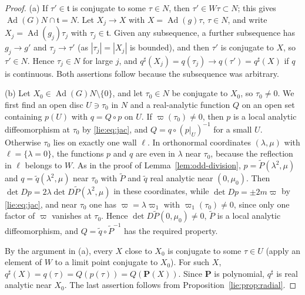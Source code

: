 \documentclass[11pt]{amsart}
\theoremstyle{definition}
\theoremstyle{remark}
\numberwithin{equation}{section}
\newcommand{\Ad}{\operatorname{Ad}}
\newcommand{\tf}{\mathfrak{t}}
\begin{document}
\begin{proof}
(a) If $\tau'\in\tf$ is conjugate to some $\tau\in N$, then $\tau'\in W\tau\subset N$; this gives $\Ad(G)N\cap\tf=N$. Let $X_j\to X$ with $X=\Ad(g)\tau$, $\tau\in N$, and write $X_j=\Ad(g_j)\tau_j$ with $\tau_j\in\tf$. Given any subsequence, a further subsequence has $g_j\to g'$ and $\tau_j\to\tau'$ (as $|\tau_j|=|X_j|$ is bounded), and then $\tau'$ is conjugate to $X$, so $\tau'\in N$. Hence $\tau_j\in N$ for large $j$, and $q^\sharp(X_j)=q(\tau_j)\to q(\tau')=q^\sharp(X)$ if $q$ is continuous. Both assertions follow because the subsequence was arbitrary.

(b) Let $X_0\in\Ad(G)N\setminus\{0\}$, and let $\tau_0\in N$ be conjugate to $X_0$, so $\tau_0\neq0$. We first find an open disc $U\ni\tau_0$ in $N$ and a real-analytic function $Q$ on an open set containing $p(U)$ with $q=Q\circ p$ on $U$. If $\varpi(\tau_0)\neq0$, then $p$ is a local analytic diffeomorphism at $\tau_0$ by \eqref{lie:eq:jac}, and $Q=q\circ(p|_U)^{-1}$ for a small $U$. Otherwise $\tau_0$ lies on exactly one wall $\ell$. In orthonormal coordinates $(\lambda,\mu)$ with $\ell=\{\lambda=0\}$, the functions $p$ and $q$ are even in $\lambda$ near $\tau_0$, because the reflection in $\ell$ belongs to $W$. As in the proof of Lemma~\ref{lem:odd-division}, $p=\widetilde P(\lambda^2,\mu)$ and $q=\widetilde q(\lambda^2,\mu)$ near $\tau_0$ with $\widetilde P$ and $\widetilde q$ real analytic near $(0,\mu_0)$. Then $\det Dp=2\lambda\det D\widetilde P(\lambda^2,\mu)$ in these coordinates, while $\det Dp=\pm2m\varpi$ by \eqref{lie:eq:jac}, and near $\tau_0$ one has $\varpi=\lambda\varpi_1$ with $\varpi_1(\tau_0)\neq0$, since only one factor of $\varpi$ vanishes at $\tau_0$. Hence $\det D\widetilde P(0,\mu_0)\neq0$, $\widetilde P$ is a local analytic diffeomorphism, and $Q=\widetilde q\circ\widetilde P^{-1}$ has the required property.

By the argument in (a), every $X$ close to $X_0$ is conjugate to some $\tau\in U$ (apply an element of $W$ to a limit point conjugate to $X_0$). For such $X$, $q^\sharp(X)=q(\tau)=Q(p(\tau))=Q(\mathbf P(X))$. Since $\mathbf P$ is polynomial, $q^\sharp$ is real analytic near $X_0$. The last assertion follows from Proposition~\ref{lie:prop:radial}.
\end{proof}
\end{document}
